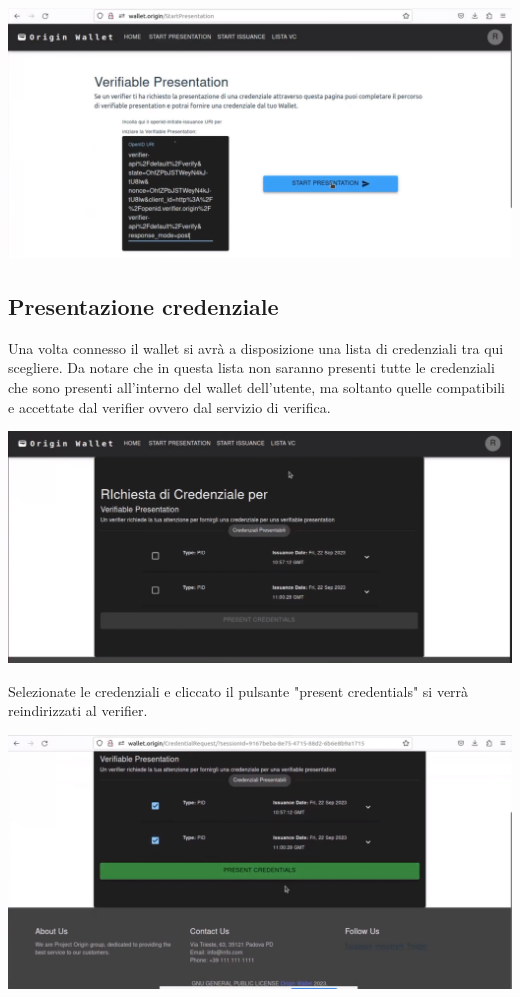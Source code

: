 \begin{center}
    \includegraphics[scale = 0.2]{./res/img/verifier/Connessione2.png}
\end{center}

\subsection{Presentazione credenziale}
Una volta connesso il wallet si avrà a disposizione una lista di credenziali tra qui scegliere. Da notare che in questa lista non saranno presenti tutte le credenziali che sono presenti all'interno del wallet dell'utente, ma soltanto quelle compatibili e accettate dal verifier ovvero dal servizio di verifica.\\
\begin{center}
    \includegraphics[scale = 0.2]{./res/img/verifier/presentazione1.png}
\end{center}
Selezionate le credenziali e cliccato il pulsante "present credentials" si verrà reindirizzati al verifier. \\
\begin{center}
    \includegraphics[scale = 0.2]{./res/img/verifier/presentazione2.png}
\end{center}
